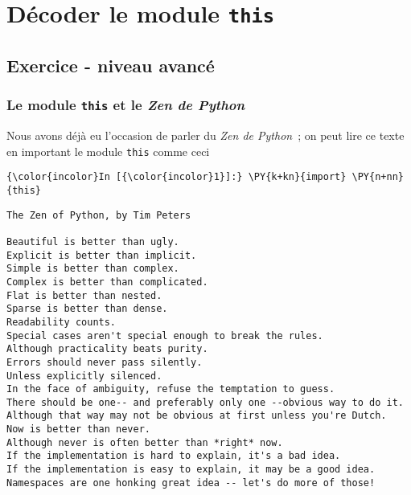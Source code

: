    
    
    
    

    

    \hypertarget{duxe9coder-le-module-this}{%
\section{\texorpdfstring{Décoder le module
\texttt{this}}{Décoder le module this}}\label{duxe9coder-le-module-this}}

    \hypertarget{exercice---niveau-avancuxe9}{%
\subsection{Exercice - niveau
avancé}\label{exercice---niveau-avancuxe9}}

    \hypertarget{le-module-this-et-le-zen-de-python}{%
\subsubsection{\texorpdfstring{Le module \texttt{this} et le \emph{Zen
de
Python}}{Le module this et le Zen de Python}}\label{le-module-this-et-le-zen-de-python}}

    Nous avons déjà eu l'occasion de parler du \emph{Zen de Python}~; on
peut lire ce texte en important le module \texttt{this} comme ceci

    \begin{Verbatim}[commandchars=\\\{\}]
{\color{incolor}In [{\color{incolor}1}]:} \PY{k+kn}{import} \PY{n+nn}{this}
\end{Verbatim}


    \begin{Verbatim}[commandchars=\\\{\}]
The Zen of Python, by Tim Peters

Beautiful is better than ugly.
Explicit is better than implicit.
Simple is better than complex.
Complex is better than complicated.
Flat is better than nested.
Sparse is better than dense.
Readability counts.
Special cases aren't special enough to break the rules.
Although practicality beats purity.
Errors should never pass silently.
Unless explicitly silenced.
In the face of ambiguity, refuse the temptation to guess.
There should be one-- and preferably only one --obvious way to do it.
Although that way may not be obvious at first unless you're Dutch.
Now is better than never.
Although never is often better than *right* now.
If the implementation is hard to explain, it's a bad idea.
If the implementation is easy to explain, it may be a good idea.
Namespaces are one honking great idea -- let's do more of those!

    \end{Verbatim}

